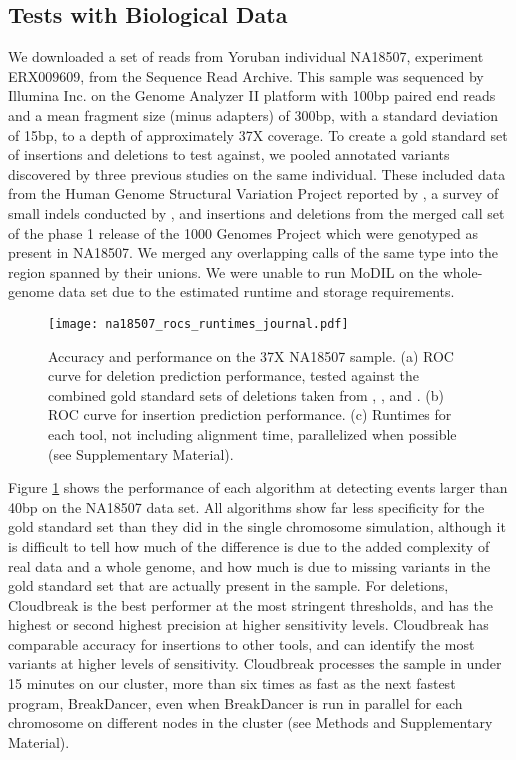 \documentclass[11pt]{article}
\begin{document}
\subsection{Tests with Biological Data}

We downloaded a set of reads from Yoruban individual NA18507, experiment ERX009609, from the Sequence Read Archive. This sample was sequenced by Illumina Inc. on the Genome Analyzer II platform with 100bp paired end reads and a mean fragment size (minus adapters) of 300bp, with a standard deviation of 15bp, to a depth of approximately 37X coverage. To create a gold standard set of insertions and deletions to test against, we pooled annotated variants discovered by three previous studies on the same individual. These included data from the Human Genome Structural Variation Project reported by \textcite{Kidd:2008p926}, a survey of small indels conducted by \textcite{Mills:2011fi}, and insertions and deletions from the merged call set of the phase 1 release of the 1000 Genomes Project \autocite{GenomesProjectConsortium:2012co} which were genotyped as present in NA18507. We merged any overlapping calls of the same type into the region spanned by their unions. We were unable to run MoDIL on the whole-genome data set due to the estimated runtime and storage requirements.

\begin{figure}
\centering
\texttt{[image: na18507\_rocs\_runtimes\_journal.pdf]}
\caption{Accuracy and performance on the 37X NA18507 sample. (a) ROC curve for deletion prediction performance, tested against the combined gold standard sets of deletions taken from \textcite{Kidd:2008p926}, \textcite{Mills:2011fi}, and \textcite{GenomesProjectConsortium:2012co}. (b) ROC curve for insertion prediction performance. (c) Runtimes for each tool, not including alignment time, parallelized when possible (see Supplementary Material). }
\label{NA18507CombinedRoc}
\end{figure}

Figure \ref{NA18507CombinedRoc} shows the performance of each algorithm at detecting events larger than 40bp on the NA18507 data set. All algorithms show far less specificity for the gold standard set than they did in the single chromosome simulation, although it is difficult to tell how much of the difference is due to the added complexity of real data and a whole genome, and how much is due to missing variants in the gold standard set that are actually present in the sample. For deletions, Cloudbreak is the best performer at the most stringent thresholds, and has the highest or second highest precision at higher sensitivity levels. Cloudbreak has comparable accuracy for insertions to other tools, and can identify the most variants at higher levels of sensitivity. Cloudbreak processes the sample in under 15 minutes on our cluster, more than six times as fast as the next fastest program, BreakDancer, even when BreakDancer is run in parallel for each chromosome on different nodes in the cluster (see Methods and Supplementary Material).
\end{document}
